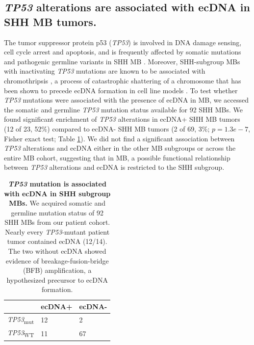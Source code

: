 \subsection{\textit{TP53} alterations are associated with ecDNA in SHH MB tumors.}
The tumor suppressor protein p53 (\textit{TP53}) is involved in DNA damage sensing, cell cycle arrest and apoptosis, and is frequently affected by somatic mutations and pathogenic germline variants in SHH MB \cite{Ramaswamy_2016, li-fraumeni_1988, waszak_2018}. Moreover, SHH-subgroup MBs with inactivating \textit{TP53} mutations are known to be associated with chromothripsis \cite{Rausch_2012}, a process of catastrophic shattering of a chromosome that has been shown to precede ecDNA formation in cell line models \cite{shoshani_2020, umbreit_2020}. To test whether \textit{TP53} mutations were associated with the presence of ecDNA in MB, we accessed the somatic and germline \textit{TP53} mutation status available for 92 SHH MBs. We found significant enrichment of \textit{TP53} alterations in ecDNA+ SHH MB tumors (12 of 23, 52\%) compared to ecDNA- SHH MB tumors (2 of 69, 3\%; $p=1.3e-7$, Fisher exact test; Table \ref{tab:shh-tp53}). We did not find a significant association between \textit{TP53} alterations and ecDNA either in the other MB subgroups or across the entire MB cohort, suggesting that in MB, a possible functional relationship between \textit{TP53} alterations and ecDNA is restricted to the SHH subgroup. 

\begin{table}[!ht]
\caption[\textit{TP53} mutation is associated with ecDNA in SHH subgroup MBs.]{\textbf{\textit{TP53} mutation is associated with ecDNA in SHH subgroup MBs.} We acquired somatic and germline mutation status of 92 SHH MBs from our patient cohort. Nearly every \textit{TP53}-mutant patient tumor contained ecDNA (12/14). The two without ecDNA showed evidence of breakage-fusion-bridge (BFB) amplification, a hypothesized precursor to ecDNA formation.}
\begin{center}
\begin{tabular}{ p{1in} p{1in} p{1in} }
\hline
 & \gls{ecDNA+} & ecDNA- \\
\hline
\textit{TP53}\textsubscript{mut} & 12 & 2 \\
\textit{TP53}\textsubscript{WT} & 11 & 67 \\
\hline
\end{tabular}
\end{center}
\label{tab:shh-tp53}
\end{table}

